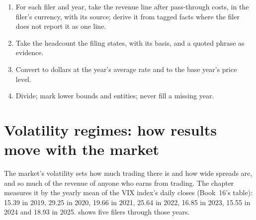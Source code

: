 \begin{method}\label{met:in:revenue-and-profit-across-the-industry:table}
\begin{enumerate}
\item For each filer and year, take the revenue line after pass-through costs, in the filer's currency, with its
source; derive it from tagged facts where the filer does not report it as one line.
\item Take the headcount the filing states, with its basis, and a quoted phrase as evidence.
\item Convert to dollars at the year's average rate and to the base year's price level.
\item Divide; mark lower bounds and entities; never fill a missing year.
\end{enumerate}
\end{method}

\section{Volatility regimes: how results move with the market}

The market's volatility sets how much trading there is and how wide spreads are, and so much of the revenue of
anyone who earns from trading. The chapter measures it by the yearly mean of the VIX index's daily closes (Book~16's
table): 15.39 in 2019, 29.25 in 2020, 19.66 in 2021, 25.64 in 2022, 16.85 in 2023, 15.55 in 2024 and 18.93 in 2025.
 shows five filers through those years.

